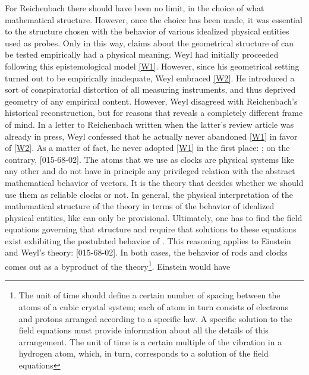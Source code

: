 \documentclass[draft]{article}
\newcommand{\WT}{Weyl's theory\xspace}
\begin{document}
For Reichenbach there should have been no limit, in the choice of what mathematical structure. However, once the choice has been made, it was essential to  the structure chosen with the behavior of various idealized physical entities used as probes. Only in this way, claims about the geometrical structure of \spti can be tested empirically had a physical meaning. Weyl had initially proceeded following this epistemological model \ref{W1}. However, since his geometrical setting turned out to be empirically inadequate, Weyl embraced \ref{W2}. He introduced a sort of conspiratorial distortion of all measuring instruments, and thus deprived geometry of any empirical content. However, Weyl disagreed with Reichenbach's historical reconstruction, but for reasons that reveals a completely different frame of mind. In a letter to Reichenbach written when the latter's review article was already in press, Weyl confessed that he actually never abandoned \ref{W1} in favor of \ref{W2}. As a matter of fact, he never adopted \ref{W1} in the first place: ; on the contrary,  [015-68-02]. The atoms that we use as clocks are physical systems like any other and do not have in principle any privileged relation with the abstract mathematical behavior of vectors. It is the theory that decides whether we should use them as reliable clocks or not. In general, the physical interpretation of the mathematical structure of the theory in terms of the behavior of idealized physical entities, like \rac can only be provisional. Ultimately, one has to find the field equations governing that structure and require that solutions to these equations exist exhibiting the postulated behavior of \rac. This reasoning applies to Einstein and \WT:  [015-68-02]. In both cases, the behavior of rods and clocks comes out as a byproduct of the theory\footnote{The unit of time should define a certain number of spacing between the atoms of a cubic crystal system; each of atom in turn consists of electrons and protons arranged according to a specific law. A specific solution to the field equations must provide information about all the details of this arrangement.  The unit of time is a certain multiple of the vibration in a hydrogen atom, which, in turn, corresponds to a solution of the field equations}. Einstein would have 
\end{document}
